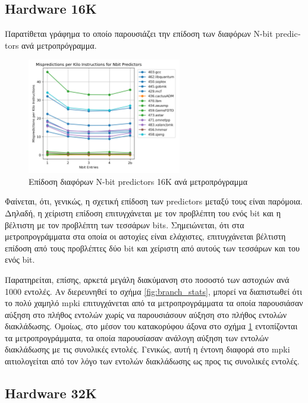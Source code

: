 \documentclass{article}
\newcommand{\eng}[1]{\foreignlanguage{english}{#1}}
\begin{document}
\subsection{\eng{Hardware 16K}}

Παρατίθεται γράφημα το οποίο παρουσιάζει την επίδοση των διαφόρων \eng{N-bit predictors} ανά μετροπρόγραμμα.

\begin{figure}[h]
    \centering
    \includegraphics[width=0.6\textwidth]{./outputs/nbit16k.png} 
    \caption{Επίδοση διαφόρων \eng{N-bit predictors 16K} ανά μετροπρόγραμμα}
    \label{fig:nbit16k}
\end{figure}
\FloatBarrier

Φαίνεται, ότι, γενικώς, η σχετική επίδοση των \eng{predictors} μεταξύ τους είναι παρόμοια. Δηλαδή, η χείριστη επίδοση επιτυγχάνεται με τον προβλέπτη του ενός \eng{bit} και η βέλτιστη με τον προβλέπτη των τεσσάρων \eng{bits}. Σημειώνεται, ότι στα μετροπρογράμματα στα οποία οι αστοχίες είναι ελάχιστες, επιτυγχάνεται βέλτιστη επίδοση από τους προβλέπτες δύο \eng{bit} και χείριστη από αυτούς των τεσσάρων και του ενός \eng{bit}. 

Παρατηρείται, επίσης, αρκετά μεγάλη διακύμανση στο ποσοστό των αστοχιών ανά 1000 εντολές. Αν διερευνηθεί το σχήμα \ref{fig:branch_stats}, μπορεί να διαπιστωθεί ότι το πολύ χαμηλό \eng{mpki} επιτυγχάνεται από τα μετροπρογράμματα τα οποία παρουσιάσαν αύξηση στο πλήθος εντολών χωρίς να παρουσιάσουν αύξηση στο πλήθος εντολών διακλάδωσης. Ομοίως, στο μέσον του κατακορύφου άξονα στο σχήμα \ref{fig:nbit16k} εντοπίζονται τα μετροπρογράμματα, τα οποία παρουσίασαν ανάλογη αύξηση των εντολών διακλάδωσης με τις συνολικές εντολές. Γενικώς, αυτή η έντονη διαφορά στο \eng{mpki} αιτιολογείται από τον λόγο των εντολών διακλάδωσης ως προς τις συνολικές εντολές. 

\subsection{\eng{Hardware 32K}}
\end{document}
